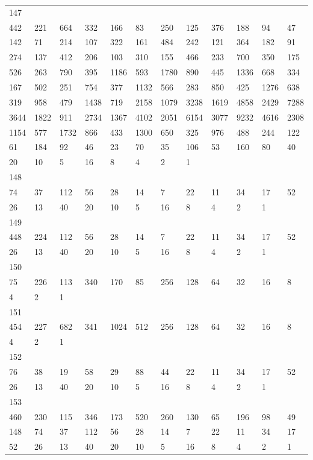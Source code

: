 \begin{longtable}{llllllllllll}
147&&&&&&&&&&&\\
442& 221& 664& 332& 166& 83& 250& 125& 376& 188& 94& 47\\
142& 71& 214& 107& 322& 161& 484& 242& 121& 364& 182& 91\\
274& 137& 412& 206& 103& 310& 155& 466& 233& 700& 350& 175\\
526& 263& 790& 395& 1186& 593& 1780& 890& 445& 1336& 668& 334\\
167& 502& 251& 754& 377& 1132& 566& 283& 850& 425& 1276& 638\\
319& 958& 479& 1438& 719& 2158& 1079& 3238& 1619& 4858& 2429& 7288\\
3644& 1822& 911& 2734& 1367& 4102& 2051& 6154& 3077& 9232& 4616& 2308\\
1154& 577& 1732& 866& 433& 1300& 650& 325& 976& 488& 244& 122\\
61& 184& 92& 46& 23& 70& 35& 106& 53& 160& 80& 40\\
20& 10& 5& 16& 8& 4& 2& 1& \\

148&&&&&&&&&&&\\
74& 37& 112& 56& 28& 14& 7& 22& 11& 34& 17& 52\\
26& 13& 40& 20& 10& 5& 16& 8& 4& 2& 1& \\

149&&&&&&&&&&&\\
448& 224& 112& 56& 28& 14& 7& 22& 11& 34& 17& 52\\
26& 13& 40& 20& 10& 5& 16& 8& 4& 2& 1& \\

150&&&&&&&&&&&\\
75& 226& 113& 340& 170& 85& 256& 128& 64& 32& 16& 8\\
4& 2& 1& \\

151&&&&&&&&&&&\\
454& 227& 682& 341& 1024& 512& 256& 128& 64& 32& 16& 8\\
4& 2& 1& \\

152&&&&&&&&&&&\\
76& 38& 19& 58& 29& 88& 44& 22& 11& 34& 17& 52\\
26& 13& 40& 20& 10& 5& 16& 8& 4& 2& 1& \\

153&&&&&&&&&&&\\
460& 230& 115& 346& 173& 520& 260& 130& 65& 196& 98& 49\\
148& 74& 37& 112& 56& 28& 14& 7& 22& 11& 34& 17\\
52& 26& 13& 40& 20& 10& 5& 16& 8& 4& 2& 1\\


\end{longtable}
